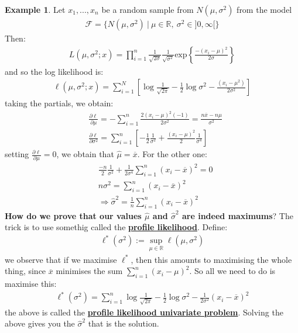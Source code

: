 \documentclass[11pt]{scrartcl}
\newcommand{\R}[0]{\mathbb{R}}
\theoremstyle{definition}
\newtheorem{ex}{Example}
\theoremstyle{remark}
\newcommand{\dfn}[1]{\textbf{\underline{#1}}}
\newcommand{\dist}[0]{\mathcal{F}}
\begin{document}
{\begin{ex} 
	Let $x_1, ..., x_n$ be a random sample from $N(\mu, \sigma^2)$ from the model
	\begin{align*}
		\dist = \{ N(\mu, \sigma^2)\ |\ \mu \in \R,\ \sigma^2 \in ]0, \infty[ \} 	
	\end{align*}
	Then: 
	\begin{align*}
		L(\mu, \sigma^2; x) = \prod_{i=1}^n \frac{1}{\sqrt{ 2 \sigma}} \frac{1}{\sqrt{\sigma^2} } \text{exp} \left\{ \frac{-(x_i - \mu)^2}{2 \sigma}		\right\} 	
	\end{align*}
	and so the log likelihood is: 
	\begin{align*}
		\ell(\mu, \sigma^2; x ) = \sum_{i=1}^N \left[ \log \frac{1}{\sqrt{2 \pi}} - \frac{1}{2} \log \sigma^2 - \frac{(x_i - \mu^2)}{2 \sigma^2}	\right] 
	\end{align*}
	taking the partials, we obtain: 
	\begin{align*}
		& \frac{\partial \ell}{\partial \mu} = - \sum_{i=1}^n \frac{2 (x_i -  \mu)^2 (-1)}{2 \sigma^2}	 = \frac{n \overline{x} - n \mu}{\sigma^2} \\
		& \frac{\partial \ell}{\partial \sigma^2} = \sum_{i=1}^n \left[ 		-\frac{1}{2} \frac{1}{\sigma^2} + \frac{(x_i - \mu)^2}{2} \frac{1}{\sigma^4} \right] 
	\end{align*}
	setting $\frac{\partial \ell}{\partial \mu} =0$, we obtain that $\hat{\mu} = \overline{x}$. For the other one: 
	\begin{align*}
		& \frac{-n}{2} \frac{1}{\sigma^2} + \frac{1}{2 \sigma^4} \sum_{i=1}^n (x_i - \overline{x} )^2 = 0  \\
		& n \sigma^2 = \sum_{i=1}^n (x_i - \overline{x})^2 \\
		& \Rightarrow \hat{\sigma}^2 = \frac{1}{n} \sum_{i=1}^n (x_i - \overline{x})^2		
	\end{align*}
	\textbf{How do we prove that our values $\hat{\mu}$ and $\hat{\sigma}^2$ are indeed maximums}? The trick is to use somethig called the \dfn{profile likelihood}. Define: 
	\begin{align}
		\ell^*(\sigma^2) := \sup_{\mu \in \R} \ell (\mu, \sigma^2) 
	\end{align}
	we observe that if we maximise $\ell^*$, then this amounts to maximising the whole thing, since $\overline{x}$ minimises the sum $\sum_{i=1}^n (x_i - \mu)^2$. So all we need to do is maximise this:
	\begin{align*}
			\ell^*(\sigma^2) = \sum_{i=1}^n \log \frac{1}{\sqrt{2 \pi}} - \frac{1}{2} \log \sigma^2 - \frac{1}{2 \sigma^2} (x_i - \overline{x})^2
	\end{align*}
 	the above is called the \dfn{profile likelihood univariate problem}. Solving the above gives you the $\hat{\sigma}^2$ that is the solution. 
\end{ex}

}
\end{document}
